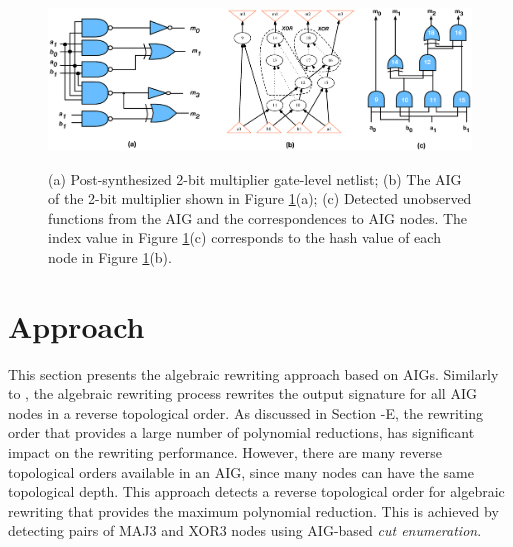 \begin{figure}[t] 
\begin{center}
\includegraphics[scale=0.25]{../figs/aig-to-gatenetlist.eps}
\caption{\color{red}(a) Post-synthesized 2-bit multiplier gate-level netlist; (b) The AIG of the 2-bit multiplier shown in Figure \ref{fig:2-bit-mult-aig}(a); (c) Detected unobserved functions from the AIG and the correspondences to AIG nodes. The index value in Figure \ref{fig:2-bit-mult-aig}(c) corresponds to the hash value of each node in Figure \ref{fig:2-bit-mult-aig}(b). }
\vspace{-3mm}
\label{fig:2-bit-mult-aig}
\end{center}
\end{figure}

\section{Approach} \label{sec:approach}

This section presents the algebraic rewriting approach based on AIGs. Similarly to \cite{ciesielski2015verification}, the algebraic rewriting process rewrites the output signature for all AIG nodes in a {\color{red}reverse topological order}. As discussed in {\color{red}Section -E}, the rewriting order that provides a large number of polynomial reductions, has significant impact on the rewriting performance. However, there are many {\color{red}reverse topological orders} available in an AIG, since many nodes can have the same topological depth. This approach detects a {\color{red}reverse topological order} for algebraic rewriting that provides the maximum polynomial reduction. This is achieved by detecting pairs of MAJ3 and XOR3 nodes using AIG-based \textit{cut enumeration}. 

